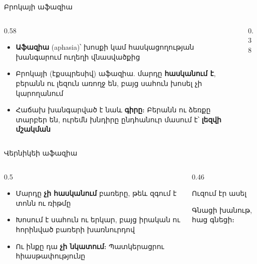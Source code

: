 \begin{frame}{Բրոկայի աֆազիա}
  \begin{columns}[c]
    \begin{column}{0.58\textwidth}
      \begin{itemize}
        \item \textbf{Աֆազիա} (aphasia)՝ խոսքի կամ հասկացողության խանգարում ուղեղի վնասվածքից
        \item Բրոկայի (էքսպրեսիվ) աֆազիա. մարդը \textbf{հասկանում է}, բերանն ու լեզուն առողջ են, բայց սահուն խոսել չի կարողանում
        \item<2-> Հաճախ խանգարված է նաև \textbf{գիրը}։ Բերանն ու ձեռքը տարբեր են, ուրեմն խնդիրը ընդհանուր մասում է՝ \textbf{լեզվի մշակման}
      \end{itemize}
    \end{column}
    \begin{column}{0.38\textwidth}
      \centering
    \end{column}
  \end{columns}
\end{frame}

\begin{frame}{Վերնիկեի աֆազիա}
  \begin{columns}[c]
    \begin{column}{0.5\textwidth}
      \begin{itemize}
        \item Մարդը \textbf{չի հասկանում} բառերը, թեև զգում է տոնն ու ռիթմը
        \item Խոսում է սահուն ու երկար, բայց իրական ու հորինված բառերի խառնուրդով
        \item<3-> Ու ինքը դա \textbf{չի նկատում}։ Պատկերացրու հիասթափությունը
      \end{itemize}
    \end{column}
    \begin{column}{0.46\textwidth}
      \begin{card}[colback=mint!35!cardwhite]
        {\blackfont\small Ուզում էր ասել}\par
        {\large Գնացի խանութ, հաց գնեցի։}
      \end{card}
      \vspace{2mm}
    \end{column}
  \end{columns}
\end{frame}

